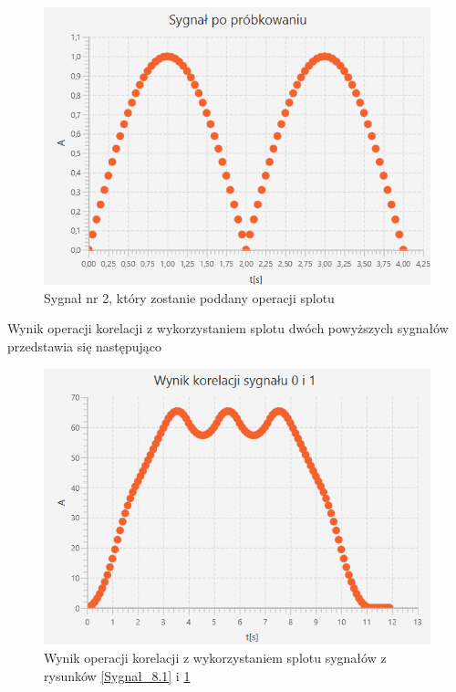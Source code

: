 \documentclass[12pt]{article}
\begin{document}
\begin{figure}[H]
    \centering
	\includegraphics[width=\linewidth]{sygnal_po_probkowaniu_4.2.png}
    \caption{Sygnał nr 2, który zostanie poddany operacji splotu}
    \label{Sygnał_8.2}
\end{figure}

Wynik operacji korelacji z wykorzystaniem splotu dwóch powyższych sygnałów przedstawia się następująco
\begin{figure}[H]
    \centering
	\includegraphics[width=\linewidth]{Korelacja_581.png}
    \caption{Wynik operacji korelacji z wykorzystaniem splotu sygnałów z rysunków \ref{Sygnał_8.1} i \ref{Sygnał_8.2}}
    \label{Wynik_8.1}
\end{figure}
\end{document}
